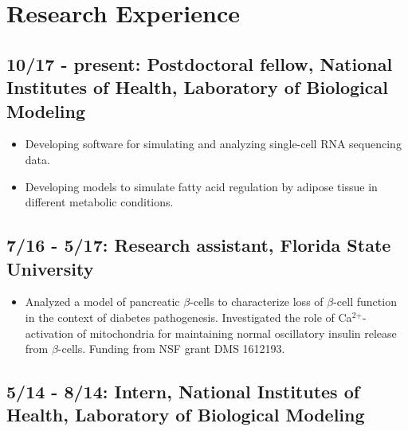 \documentclass[11pt]{cv}
\begin{document}
\section*{Research Experience}
\label{sec:orge83225e}
\subsection*{10/17 - present: Postdoctoral fellow, National Institutes of Health, Laboratory of Biological Modeling}
\label{sec:org7c2fcf6}
\begin{itemize}
\item Developing software for simulating and analyzing single-cell RNA sequencing data.\\
\item Developing models to simulate fatty acid regulation by adipose tissue in different metabolic conditions.\\
\end{itemize}
\subsection*{7/16 - 5/17: Research assistant, Florida State University}
\label{sec:orga9331ef}
\begin{itemize}
\item Analyzed a model of pancreatic \(\beta\)-cells to characterize loss of \(\beta\)-cell function in the context of diabetes pathogenesis. Investigated the role of Ca\(^{\text{2+}}\)-activation of mitochondria for maintaining normal oscillatory insulin release from \(\beta\)-cells. Funding from NSF grant DMS 1612193.\\
\end{itemize}
\subsection*{5/14 - 8/14: Intern, National Institutes of Health, Laboratory of Biological Modeling}
\label{sec:org8fcd3ff}
\end{document}
